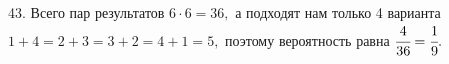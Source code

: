 43. Всего пар результатов $6\cdot6=36,$ а подходят нам только 4 варианта $1+4=2+3=3+2=4+1=5,$ поэтому вероятность равна $\cfrac{4}{36}=\cfrac{1}{9}.$\\
